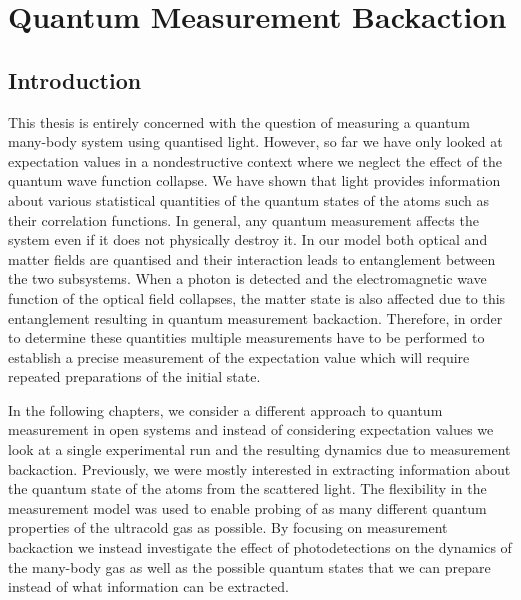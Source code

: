 
\chapter{Quantum Measurement Backaction}  
\label{chap:backaction}

\ifpdf
    \graphicspath{{Chapter4/Figs/Raster/}{Chapter4/Figs/PDF/}{Chapter4/Figs/}}
\else
    \graphicspath{{Chapter4/Figs/Vector/}{Chapter4/Figs/}}
\fi



\section{Introduction}

This thesis is entirely concerned with the question of measuring a
quantum many-body system using quantised light. However, so far we
have only looked at expectation values in a nondestructive context
where we neglect the effect of the quantum wave function collapse. We
have shown that light provides information about various statistical
quantities of the quantum states of the atoms such as their
correlation functions. In general, any quantum measurement affects the
system even if it does not physically destroy it. In our model both
optical and matter fields are quantised and their interaction leads to
entanglement between the two subsystems. When a photon is detected and
the electromagnetic wave function of the optical field collapses, the
matter state is also affected due to this entanglement resulting in
quantum measurement backaction. Therefore, in order to determine these
quantities multiple measurements have to be performed to establish a
precise measurement of the expectation value which will require
repeated preparations of the initial state.

In the following chapters, we consider a different approach to quantum
measurement in open systems and instead of considering expectation
values we look at a single experimental run and the resulting dynamics
due to measurement backaction. Previously, we were mostly interested
in extracting information about the quantum state of the atoms from
the scattered light. The flexibility in the measurement model was used
to enable probing of as many different quantum properties of the
ultracold gas as possible. By focusing on measurement backaction we
instead investigate the effect of photodetections on the dynamics of
the many-body gas as well as the possible quantum states that we can
prepare instead of what information can be extracted.

